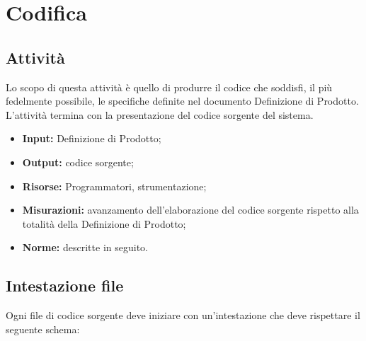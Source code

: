 \section{Codifica} {
\subsection{Attività}{
Lo scopo di questa attività è quello di produrre il codice che soddisfi, il più fedelmente possibile, le specifiche definite nel documento Definizione di Prodotto.\\
L'attività termina con la presentazione del codice sorgente del sistema.
\begin{itemize}
	\item []{\textbf{Input:} Definizione di Prodotto;}
	\item []{\textbf{Output:} codice sorgente;}
	\item []{\textbf{Risorse:} Programmatori, strumentazione;}
	\item []{\textbf{Misurazioni:} avanzamento dell'elaborazione del codice sorgente rispetto alla totalità della Definizione di Prodotto;}
	\item []{\textbf{Norme:} descritte in seguito.}
\end{itemize}
}

	\subsection{Intestazione file}{
		Ogni file di codice sorgente deve iniziare con un'intestazione che deve rispettare il seguente schema:
		
}}
